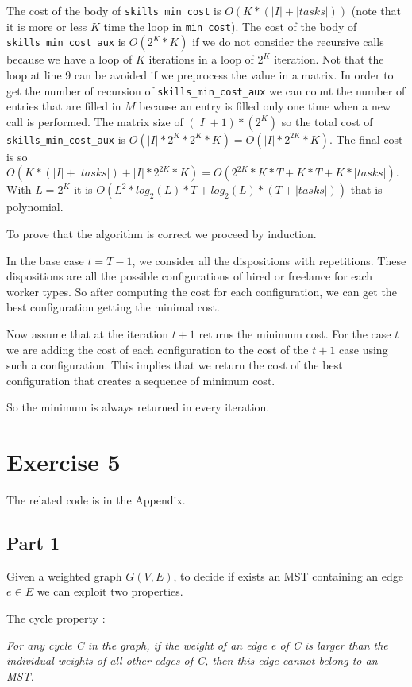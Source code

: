 \documentclass[paper=a4, fontsize=11pt]{scrartcl} %
\numberwithin{equation}{section} %
\numberwithin{figure}{section} %
\numberwithin{table}{section} %
\begin{document}
The cost of the body of \verb|skills_min_cost| is $O(K*(|I|+|tasks|))$ (note that it is more or less $K$ time the loop in \verb|min_cost|).
The cost of the body of \verb|skills_min_cost_aux| is $O(2^K*K)$ if we do not consider the recursive calls because we have a loop of $K$ iterations in a loop of $2^K$ iteration. Not that the loop at line 9 can be avoided if we preprocess the value in a matrix.
In order to get the number of recursion of \verb|skills_min_cost_aux| we can count the number of entries that are filled in $M$ because an entry is filled only one time when a new call is performed.
The matrix size of $(|I|+1)*(2^K)$ so the total cost of \verb|skills_min_cost_aux| is $O(|I|*2^K*2^K*K) = O(|I|*2^{2K}*K)$.
The final cost is so $O(K*(|I|+|tasks|) + |I|*2^{2K}*K) = O(2^{2K}*K*T + K*T + K*|tasks|)$. With $L = 2^K$ it is $O(L^2*log_2(L)*T + log_2(L)*(T+|tasks|))$ that is polynomial.

To prove that the algorithm is correct we proceed by induction.

In the base case $t = T-1$, we consider all the dispositions with repetitions. These dispositions are all the possible configurations of hired or freelance for each worker types. So after computing the cost for each configuration, we can get the best configuration getting the minimal cost.

Now assume that at the iteration $t+1$ returns the minimum cost.
For the case $t$ we are adding the cost of each configuration to the cost of the $t+1$ case using such a configuration. This implies that we return the cost of the best configuration that creates a sequence of minimum cost.

So the minimum is always returned in every iteration.

\bigskip
\section*{Exercise 5}

The related code is in the Appendix.

\subsection*{Part 1}

Given a weighted graph $G(V, E)$, to decide if exists an MST containing an edge $e \in E$ we can exploit two properties.

The cycle property \cite{cicle_prop}:

\bigskip
{\em For any cycle C in the graph, if the weight of an edge e of C is larger than the individual weights of all other edges of C, then this edge cannot belong to an MST.} 
\bigskip
\end{document}
